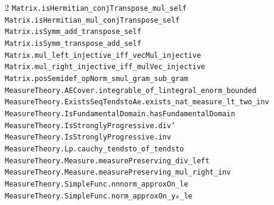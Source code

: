 \documentclass[10pt,a4paper]{article}
\begin{document}
\begin{multicols}{2}
\texttt{Matrix.\allowbreak{}isHermitian\_conjTranspose\_mul\_self} \\
\texttt{Matrix.\allowbreak{}isHermitian\_mul\_conjTranspose\_self} \\
\texttt{Matrix.\allowbreak{}isSymm\_add\_transpose\_self} \\
\texttt{Matrix.\allowbreak{}isSymm\_transpose\_add\_self} \\
\texttt{Matrix.\allowbreak{}mul\_left\_injective\_iff\_vecMul\_injective} \\
\texttt{Matrix.\allowbreak{}mul\_right\_injective\_iff\_mulVec\_injective} \\
\texttt{Matrix.\allowbreak{}posSemidef\_opNorm\_smul\_gram\_sub\_gram} \\
\texttt{MeasureTheory.\allowbreak{}AECover.\allowbreak{}integrable\_of\_lintegral\_enorm\_bounded} \\
\texttt{MeasureTheory.\allowbreak{}ExistsSeqTendstoAe.\allowbreak{}exists\_nat\_measure\_lt\_two\_inv} \\
\texttt{MeasureTheory.\allowbreak{}IsFundamentalDomain.\allowbreak{}hasFundamentalDomain} \\
\texttt{MeasureTheory.\allowbreak{}IsStronglyProgressive.\allowbreak{}div'} \\
\texttt{MeasureTheory.\allowbreak{}IsStronglyProgressive.\allowbreak{}inv} \\
\texttt{MeasureTheory.\allowbreak{}Lp.\allowbreak{}cauchy\_tendsto\_of\_tendsto} \\
\texttt{MeasureTheory.\allowbreak{}Measure.\allowbreak{}measurePreserving\_div\_left} \\
\texttt{MeasureTheory.\allowbreak{}Measure.\allowbreak{}measurePreserving\_mul\_right\_inv} \\
\texttt{MeasureTheory.\allowbreak{}SimpleFunc.\allowbreak{}nnnorm\_approxOn\_le} \\
\texttt{MeasureTheory.\allowbreak{}SimpleFunc.\allowbreak{}norm\_approxOn\_y₀\_le} \\

\end{multicols}
\end{document}
